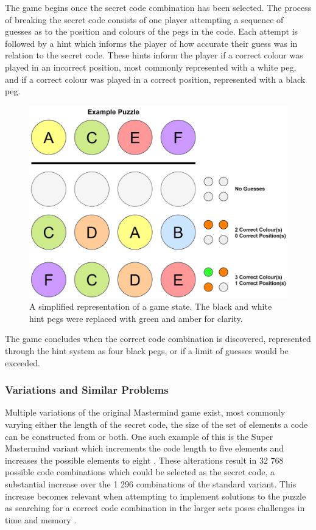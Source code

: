\documentclass[11pt]{article}  %
\theoremstyle{definition}
\theoremstyle{remark}
\begin{document}
The game begins once the secret code combination has been selected. The process of breaking the secret code consists of one player attempting a sequence of guesses as to the position and colours of the pegs in the code. Each attempt is followed by a hint which informs the player of how accurate their guess was in relation to the secret code. These hints inform the player if a correct colour was played in an incorrect position, most commonly represented with a white peg, and if a correct colour was played in a correct position, represented with a black peg.

\begin{figure}[H]
\centering
\includegraphics[scale=0.4]{guesses}
\caption{A simplified representation of a game state. The black and white hint pegs were replaced with green and amber for clarity.}
\end{figure}

The game concludes when the correct code combination is discovered, represented through the hint system as four black pegs, or if a limit of guesses would be exceeded.

\subsubsection {Variations and Similar Problems}

Multiple variations of the original Mastermind game exist, most commonly varying either the length of the secret code, the size of the set of elements a code can be constructed from or both. One such example of this is the Super Mastermind variant which increments the code length to five elements and increases the possible elements to eight \cite {SuperMM}. These alterations result in 32 768 possible code combinations which could be selected as the secret code, a substantial increase over the 1 296 combinations of the standard variant. This increase becomes relevant when attempting to implement solutions to the puzzle as searching for a correct code combination in the larger sets poses challenges in time and memory \cite {ExhaustiveMM}.
\end{document}
